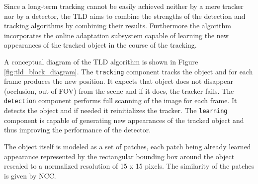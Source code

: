Since a long-term tracking cannot be easily achieved neither by a mere tracker nor by a detector, the TLD aims to combine the strengths of the detection and tracking algorithms by combining their results. Furthermore the algorithm incorporates the online adaptation subsystem capable of learning the new appearances of the tracked object in the course of the tracking.

A conceptual diagram of the TLD algorithm is shown in Figure \ref{fig:tld_block_diagram}. The \texttt{tracking} component tracks the object and for each frame produces the new position. It expects that object does not disappear (occlusion, out of FOV) from the scene and if it does, the tracker fails. The \texttt{detection} component performs full scanning of the image for each frame. It detects the object and if needed it reinitializes the tracker. The \texttt{learning} component is capable of generating new appearances of the tracked object and thus improving the performance of the detector. 

The object itself is modeled as a set of patches, each patch being already learned appearance represented by the rectangular bounding box around the object rescaled to a normalized resolution of 15 x 15 pixels. The similarity of the patches is given by NCC.

